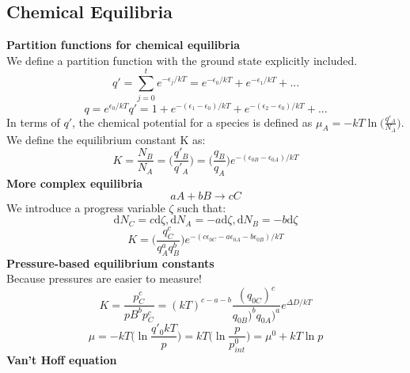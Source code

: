 \documentclass[8pt]{article}
\numberwithin{equation}{section}
\begin{document}
\begin{multicols}{2}
\section{Chemical Equilibria}
\textbf{Partition functions for chemical equilibria} \\
We define a partition function with the ground state explicitly included. 
\begin{equation}
q'=\sum_{j=0}^{t}e^{-\epsilon_{j}/kT}=e^{-\epsilon_{0}/kT}+e^{-\epsilon_{1}/kT}+...\tag{13.6} 
\end{equation}
\begin{equation}
q=e^{\epsilon_{0}/kT}q'=1+e^{-(\epsilon_{1}-\epsilon_{0})/kT}+e^{-(\epsilon_{2}-\epsilon_{0})/kT}+... \tag{13.7}
\end{equation}
In terms of $q'$, the chemical potential for a species is defined as $\mu_{A}=-kT\ln{\bigg(\frac{q'_{A}}{N_{A}}\bigg)}$. \\
We define the equilibrium constant K as: 
\begin{equation}
K=\frac{N_{B}}{N_{A}}=\bigg(\frac{q'_{B}}{q'_{A}}\bigg)=\bigg(\frac{q_{B}}{q_{A}}\bigg)e^{-(\epsilon_{0B}-\epsilon_{0A})/kT} \tag{13.10}
\end{equation}
\textbf{More complex equilibria}
\begin{equation}
aA+bB\rightarrow cC \tag{13.11}
\end{equation}
We introduce a progress variable $\zeta$ such that: 
\begin{equation}
\mathrm{d}N_{C}=c\mathrm{d}\zeta, \mathrm{d}N_{A}=-a\mathrm{d}\zeta, \mathrm{d}N_{B}=-b\mathrm{d}\zeta \tag{13.13}
\end{equation} 
\begin{equation}
K=\bigg(\frac{q_{C}^{c}}{q_{A}^{a}q_{B}^{b}}\bigg)e^{-(c\epsilon_{0C}-a\epsilon_{0A}-b\epsilon_{0B})/kT} \tag{13.17}
\end{equation}
\textbf{Pressure-based equilibrium constants}\\
Because pressures are easier to measure! 
\begin{equation}
K=\frac{p_{C}^{c}}{p{B}^{b}p_{C}^{c}}=(kT)^{c-a-b}\frac{(q_{0C})^{c}}{q_{0B})^{b}q_{0A})^{a}}e^{\Delta D/kT} \tag{13.18}
\end{equation}
\begin{equation}
\mu=-kT\bigg(\ln{\frac{q'_{0}kT}{p}}\bigg)=kT\bigg(\ln{\frac{p}{p_{int}^{0}}}\bigg)=\mu^{0}+kT\ln{p} \tag{13.29}
\end{equation}
\textbf{Van't Hoff equation}
\begin{equation}

\end{equation}
\end{multicols}
\end{document}

